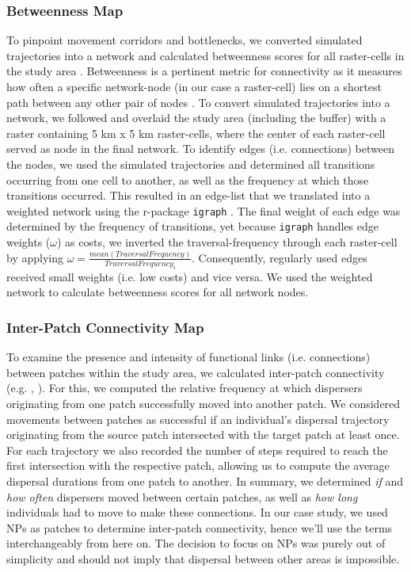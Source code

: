\documentclass[abstract=on,10pt,a4paper,bibliography=totocnumbered]{article}
\begin{document}
\subsubsection{Betweenness Map}
To pinpoint movement corridors and bottlenecks, we converted simulated
trajectories into a network and calculated betweenness scores for all
raster-cells in the study area \citep{BastilleRousseau.2018}. Betweenness is a
pertinent metric for connectivity as it measures how often a specific
network-node (in our case a raster-cell) lies on a shortest path between any
other pair of nodes \citep{BastilleRousseau.2018}. To convert simulated
trajectories into a network, we followed \cite{BastilleRousseau.2018} and
overlaid the study area (including the buffer) with a raster containing 5 km x 5
km raster-cells, where the center of each raster-cell served as node in the
final network. To identify edges (i.e. connections) between the nodes, we used
the simulated trajectories and determined all transitions occurring from one
cell to another, as well as the frequency at which those transitions occurred.
This resulted in an edge-list that we translated into a weighted network using
the r-package {\tt igraph} \citep{Gabor.2006}. The final weight of each edge was
determined by the frequency of transitions, yet because {\tt igraph} handles
edge weights (\(\omega\)) as costs, we inverted the traversal-frequency through
each raster-cell by applying \(\omega = \frac{mean(Traversal
Frequency)}{Traversal Frequency_i}\). Consequently, regularly used edges
received small weights (i.e. low costs) and vice versa. We used the weighted
network to calculate betweenness scores for all network nodes.

\subsubsection{Inter-Patch Connectivity Map}
To examine the presence and intensity of functional links (i.e. connections)
between patches within the study area, we calculated inter-patch connectivity
(e.g. \citealp{Gustafson.1996}, \citealp{Kanagaraj.2013}). For this, we computed
the relative frequency at which dispersers originating from one patch
successfully moved into another patch. We considered movements between patches
as successful if an individual's dispersal trajectory originating from the
source patch intersected with the target patch at least once. For each
trajectory we also recorded the number of steps required to reach the first
intersection with the respective patch, allowing us to compute the average
dispersal durations from one patch to another. In summary, we determined
\textit{if} and \textit{how often} dispersers moved between certain patches, as
well as \textit{how long} individuals had to move to make these connections. In
our case study, we used NPs as patches to determine inter-patch connectivity,
hence we'll use the terms interchangeably from here on. The decision to focus on
NPs was purely out of simplicity and should not imply that dispersal between
other areas is impossible.
\end{document}
